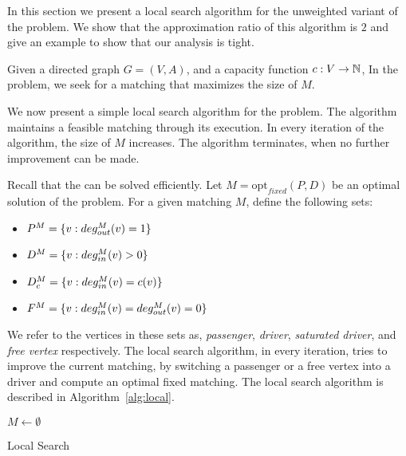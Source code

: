 \label{sec:uwcm}
In this section we present a local search algorithm for the unweighted
variant of the problem.
We show that the approximation ratio of this algorithm is $2$ and give an example
to show that our analysis is tight.

Given a directed graph $G = (V, A)$, 
and a capacity function ${c : V \rightarrow \mathbb{N}}$, 
In the \textsc{\UWCARPOOL{}} problem, 
we seek for a matching that maximizes the size of $M$.

We now present a simple local search algorithm for the problem. 
The algorithm maintains a feasible matching through its execution.
In every iteration of the algorithm, the size of $M$ increases.
The algorithm terminates, when no further improvement can be made. 

Recall that the \FIXEDCARPOOL{} can be solved efficiently.
Let $M = \text{opt}_{fixed}(P, D)$ be an optimal solution of the
\FIXEDCARPOOL{} problem.
%
For a given matching $M$, define the following sets:
\begin{itemize}
\item $P^M = \{v : deg^M_{out}(v) = 1\}$
\item $D^M = \{v : deg^M_{in}(v) > 0\}$
\item $D^M_c = \{v : deg^M_{in}(v) = c(v)\}$
\item $F^M = \{v : deg^M_{in}(v) = deg^M_{out}(v) = 0\}$ 
\end{itemize}
We refer to the vertices in these sets as, \emph{passenger}, 
\emph{driver}, \emph{saturated driver}, and \emph{free vertex} respectively.
The local search algorithm, in every iteration, 
tries to improve the current matching, 
by switching a passenger or a free vertex into a driver 
and compute an optimal fixed matching.
The local search algorithm is described in
Algorithm~\ref{alg:local}.

\begin{algorithm}
$M \leftarrow \emptyset$					\\

\caption{
\label{alg:local}
Local Search}
\end{algorithm}

